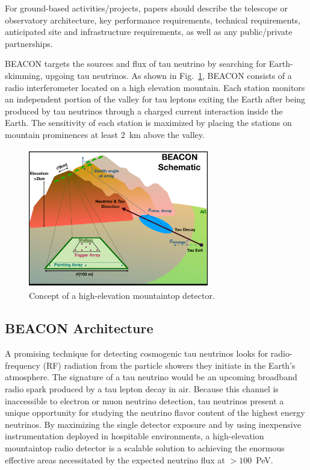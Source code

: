 \documentclass[12pt]{article}
\begin{document}
For ground-based activities/projects, papers should describe the telescope or observatory architecture, key performance requirements, technical requirements, anticipated site and infrastructure requirements, as well as any public/private partnerships.
\color{black}

BEACON targets the sources and flux of tau neutrino by searching for Earth-skimming, upgoing tau neutrinos. As shown in Fig.~\ref{fig:concept}, BEACON consists of a radio interferometer located on a high elevation mountain. Each station monitors an independent portion of the valley for tau leptons exiting the Earth after being produced by tau neutrinos through a charged current interaction inside the Earth. The sensitivity of each station is maximized by placing the stations on mountain prominences at least 2~km above the valley. 

\begin{figure}[htbp]
\begin{center}
\includegraphics[width=0.7\textwidth]{figures/BEACON_ICRC_Concept.pdf}
\caption{Concept of a high-elevation mountaintop detector.}
\label{fig:concept}
\end{center}
\end{figure}

\subsection{BEACON Architecture}

A promising technique for detecting cosmogenic tau neutrinos looks for radio-frequency (RF) radiation from the particle showers they initiate in the Earth's atmosphere. The signature of a tau neutrino would be an upcoming broadband radio spark produced by a tau lepton decay in air. Because this channel is inaccessible to electron or muon neutrino detection, tau neutrinos present a unique opportunity for studying the neutrino flavor content of the highest energy neutrinos. By maximizing the single detector exposure and by using inexpensive instrumentation deployed in hospitable environments, a high-elevation mountaintop radio detector is a scalable solution to achieving the enormous effective areas necessitated by the expected neutrino flux at $>100$~PeV. 
\end{document}
